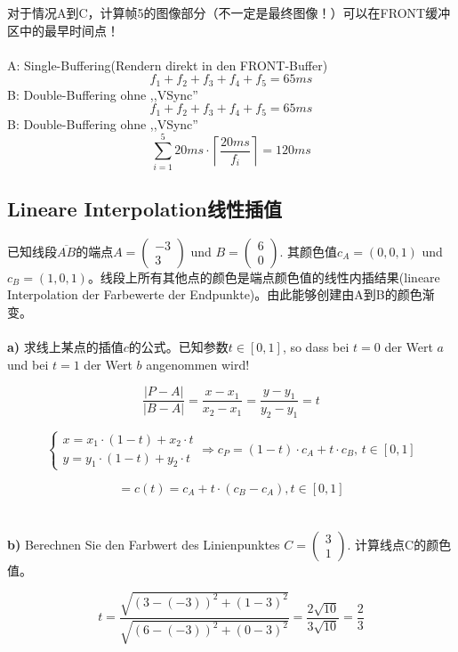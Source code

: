 \documentclass[fleqn]{article}
\begin{document}
对于情况A到C，计算帧5的图像部分（不一定是最终图像！）可以在FRONT缓冲区中的最早时间点！
\\
\\
\indent\indent\indent A: Single-Buffering(Rendern direkt in den FRONT-Buffer)
$$f_1+f_2+f_3+f_4+f_5=65ms$$
\indent\indent\indent B: Double-Buffering ohne ,,VSync''
$$f_1+f_2+f_3+f_4+f_5=65ms$$
\indent\indent\indent B: Double-Buffering ohne ,,VSync''
$$\sum^5_{i=1}20ms\cdot \left\lceil\frac{20ms}{f_i}\right\rceil=120ms$$

\subsection{Lineare Interpolation线性插值}

已知线段$\overline{AB}$的端点$A=\begin{pmatrix}
    -3\\3
\end{pmatrix}$ und $B=\begin{pmatrix}
    6\\0
\end{pmatrix}$. 其颜色值$c_A = (0, 0, 1)$ und $c_B = (1, 0, 1)$。线段上所有其他点的颜色是端点颜色值的线性内插结果(lineare Interpolation der Farbewerte der Endpunkte)。由此能够创建由A到B的颜色渐变。
\\
\\
\textbf{a)} 求线上某点的插值$c$的公式。已知参数$t\in [0, 1]$, so dass bei $t = 0$ der Wert $a$ und bei $t = 1$ der Wert $b$ angenommen wird!

$$\frac{|P-A|}{|B-A|}=\frac{x-x_1}{x_2-x_1}=\frac{y-y_1}{y_2-y_1}=t$$

$$\left\{
    \begin{aligned}
        x=x_1\cdot(1-t)+x_2\cdot t\\
        y=y_1\cdot(1-t)+y_2\cdot t
    \end{aligned}    
\right.\Rightarrow c_P=(1-t)\cdot c_A +t\cdot c_B,\,t\in[0,1]$$

$$= c(t) = c_A + t\cdot(c_B − c_A), t \in [0, 1]$$
\\
\\
\textbf{b)} 
Berechnen Sie den Farbwert des Linienpunktes $C=\begin{pmatrix}
    3\\1
\end{pmatrix}$. 计算线点C的颜色值。

$$t=\frac{\sqrt{(3-(-3))^2+(1-3)^2}}{\sqrt{(6-(-3))^2+(0-3)^2}}=\frac{2\sqrt{10}}{3\sqrt{10}}=\frac{2}{3}$$
\end{document}
